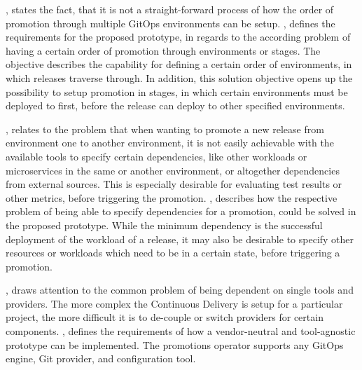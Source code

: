 ,
states the fact, that it is not a straight-forward process of how the order of promotion
through multiple GitOps environments can be setup.
,
defines the requirements for the proposed prototype,
in regards to the according problem of having a certain order of promotion through environments or stages.
The objective describes the capability for defining a certain order of environments, in which releases traverse through.
In addition, this solution objective opens up the possibility to setup promotion in stages, in which
certain environments must be deployed to first, before the release can deploy to other specified environments.

,
relates to the problem that when wanting to promote a new release from environment one to another environment,
it is not easily achievable with the available tools to specify certain dependencies, like other workloads or
microservices in the same or another environment, or altogether dependencies from external sources.
This is especially desirable for evaluating test results or other metrics, before triggering the promotion.
,
describes how the respective problem of being able to specify dependencies for a promotion,
could be solved in the proposed prototype. While the minimum dependency is the successful deployment
of the workload of a release,
it may also be desirable to specify other resources or workloads which need to be in a certain state,
before triggering a promotion.

,
draws attention to the common problem of being dependent on single tools and providers.
The more complex the Continuous Delivery is setup for a particular project,
the more difficult it is to de-couple or switch providers for certain components.
,
defines the requirements of how a vendor-neutral and tool-agnostic prototype can be implemented.
The promotions operator supports any GitOps engine, Git provider, and configuration tool.

